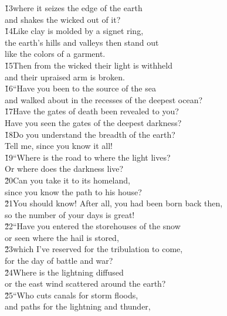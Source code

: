 \begin{poetry}
\poeml \v{13}where it seizes the edge of the earth \\
\poemll    and shakes the wicked out of it? \\
\poeml \v{14}Like clay is molded by a signet ring, \\
\poemll    the earth's hills and valleys then stand out \\
\poemlll       like the colors of a garment. \\
\poeml \v{15}Then from the wicked their light is withheld \\
\poemll    and their upraised arm is broken. \\
\poeml \v{16}``Have you been to the source of the sea \\
\poemll    and walked about in the recesses of the deepest ocean? \\
\poeml \v{17}Have the gates of death been revealed to you? \\
\poemll    Have you seen the gates of the deepest darkness? \\
\poeml \v{18}Do you understand the breadth of the earth? \\
\poemll    Tell me, since you know it all! \\
\poeml \v{19}``Where is the road to where the light lives? \\
\poemll    Or where does the darkness live? \\
\poeml \v{20}Can you take it to its homeland, \\
\poemll    since you know the path to his house? \\
\poeml \v{21}You should know! After all, you had been born back then, \\
\poemll    so the number of your days is great! \\
\poeml \v{22}``Have you entered the storehouses of the snow \\
\poemll    or seen where the hail is stored, \\
\poeml \v{23}which I've reserved for the tribulation to come, \\
\poemll    for the day of battle and war? \\
\poeml \v{24}Where is the lightning diffused \\
\poemll    or the east wind scattered around the earth? \\
\poeml \v{25}``Who cuts canals for storm floods, \\
\poemll    and paths for the lightning and thunder, \\

\end{poetry}
